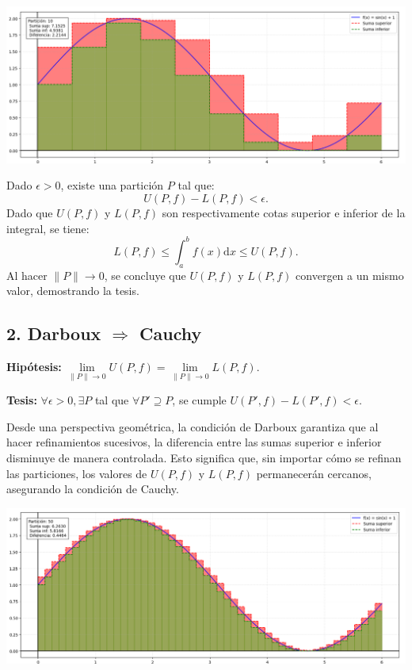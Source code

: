 \documentclass{article}
\begin{document}
\begin{center}
    \includegraphics[width=1\textwidth]{Figure_1.png}
\end{center}

Dado $\epsilon > 0$, existe una partición $P$ tal que:
\[
U(P, f) - L(P, f) < \epsilon.
\]
Dado que $U(P, f)$ y $L(P, f)$ son respectivamente cotas superior e inferior de la integral, se tiene:
\[
L(P, f) \leq \int_a^b f(x) \mathrm{d}x \leq U(P, f).
\]
Al hacer $\lVert P \rVert \to 0$, se concluye que $U(P, f)$ y $L(P, f)$ convergen a un mismo valor, demostrando la tesis.

\subsection*{2. Darboux $\Rightarrow$ Cauchy}
\textbf{Hipótesis:} $\lim\limits_{\lVert P \rVert \to 0} U(P, f) = \lim\limits_{\lVert P \rVert \to 0} L(P, f)$.

\textbf{Tesis:} $\forall \epsilon > 0, \exists P$ tal que $\forall P' \supseteq P$, se cumple $U(P', f) - L(P', f) < \epsilon$.

Desde una perspectiva geométrica, la condición de Darboux garantiza que al hacer refinamientos sucesivos, la diferencia entre las sumas superior e inferior disminuye de manera controlada. Esto significa que, sin importar cómo se refinan las particiones, los valores de $U(P, f)$ y $L(P, f)$ permanecerán cercanos, asegurando la condición de Cauchy.

\begin{center}
    \includegraphics[width=1\textwidth]{Figure_2.png}
\end{center}
\end{document}
